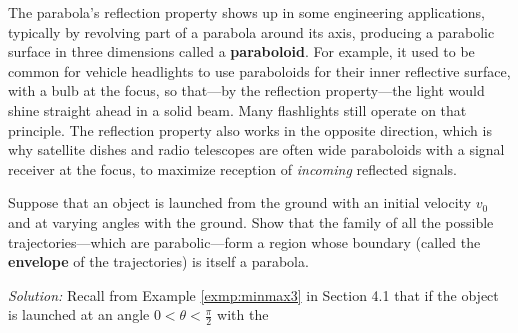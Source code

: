 The parabola's reflection property shows up in some engineering applications,
typically by revolving part of a parabola around its axis, producing a parabolic
surface in three dimensions called a \textbf{paraboloid}. For
example, it used to be common for vehicle headlights to use paraboloids for
their inner reflective surface, with a bulb at the focus, so that---by the
reflection property---the light would shine straight ahead in a solid beam. Many
flashlights still operate on that principle. The reflection property also works
in the opposite direction, which is why satellite dishes and radio telescopes
are often wide paraboloids with a signal receiver at the focus, to maximize
reception of \emph{incoming} reflected signals.
\newpage
\begin{exmp}\label{exmp:parabenvelope}
\noindent Suppose that an object is launched from the ground with an initial
velocity $v_0$ and at varying angles with the ground. Show that the family of
all the possible trajectories---which are parabolic---form a region whose
boundary (called the \textbf{envelope} of the trajectories) is itself a
parabola.\vspace{1mm}
\par\noindent\emph{Solution:} Recall from Example \ref{exmp:minmax3} in Section
4.1 that if the object is launched at an angle $0<\theta<\frac{\pi}{2}$ with the

\end{exmp}
